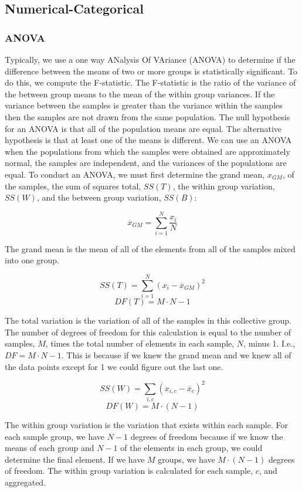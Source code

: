 \documentclass{article}
\begin{document}
\subsection{Numerical-Categorical}
\subsubsection*{ANOVA}
Typically, we use a one way ANalysis Of VAriance (ANOVA) to determine if the difference between the means of two or more groups is statistically significant. To do this, we compute the F-statistic. The F-statistic is the ratio of the variance of the between group means to the mean of the within group variances. If the variance between the samples is greater than the variance within the samples then the samples are not drawn from the same population. The null hypothesis for an ANOVA is that all of the population means are equal. The alternative hypothesis is that at least one of the means is different. We can use an ANOVA when the populations from which the samples were obtained are approximately normal, the samples are independent, and the variances of the populations are equal. To conduct an ANOVA, we must first determine the grand mean, $x_{GM}$, of the samples, the sum of squares total, $SS(T)$, the within group variation, $SS(W)$, and the between group variation, $SS(B)$:

\[\overline{x}_{GM} = \sum_{i=1}^{N}\frac{x_i}{N}\]

\noindent
The grand mean is the mean of all of the elements from all of the samples mixed into one group.

\[SS(T) = \sum_{i=1}^N(x_i - \overline{x}_{GM})^2\]
\[DF(T) = M \cdot N - 1\]

\noindent
The total variation is the variation of all of the samples in this collective group. The number of degrees of freedom for this calculation is equal to the number of samples, $M$, times the total number of elements in each sample, $N$, minus 1. I.e., $DF = M \cdot N - 1$. This is because if we knew the grand mean and we knew all of the data points except for 1 we could figure out the last one. 

\[SS(W) = \sum_{i, c}(x_{i, c} - \overline{x}_c)^2\]
\[DF(W) = M \cdot (N - 1)\]

\noindent
The within group variation is the variation that exists within each sample. For each sample group, we have $N - 1$ degrees of freedom because if we know the means of each group and $N - 1$ of the elements in each group, we could determine the final element. If we have $M$ groups, we have $M \cdot (N - 1)$ degrees of freedom. The within group variation is calculated for each sample, $c$, and aggregated.
\end{document}
